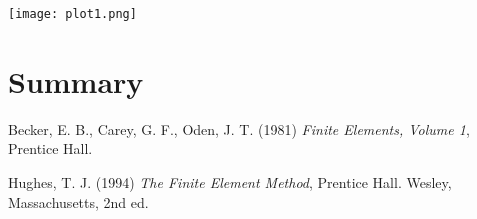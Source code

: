 \documentclass[12pt]{extreport}
\begin{document}
\texttt{[image: plot1.png]}

\section*{Summary}

\begin{thebibliography}{3}
Becker, E. B., Carey, G. F., Oden, J. T. (1981) \emph{Finite Elements, Volume 1}, Prentice Hall.

Hughes, T. J. (1994) \emph{The Finite Element Method}, Prentice Hall.
Wesley, Massachusetts, 2nd ed.
\end{thebibliography}
\end{document}
